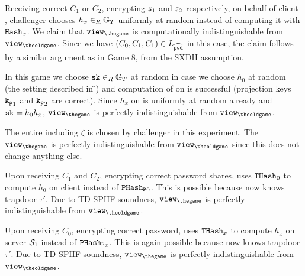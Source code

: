 \Gh Receiving correct $C_1$ or $C_2$, \ie encrypting $\mathfrak{s}_1$ and $\mathfrak{s}_2$ respectively, on behalf of client \Client, challenger \Challenger chooses $h_x\in_R\mathbb{G}_T$ uniformly at random instead of computing it with $\mathtt{Hash}_x$.
We claim that $\view_{\thegame}$ is computationally indistinguishable from $\view_{\theoldgame}$.
Since we have $(C_0,C_1,C_1)\in L_{\widehat{\mathtt{pwd}}}$ in this case, the claim follows by a similar argument as in Game 8, \ie from the SXDH assumption.

\Gh In this game we choose $\mathtt{sk}\in_R\mathbb{G}_T$ at random in case we choose $h_0$ at random (the setting described in \G{\theoldgame}) and computation of \sk on \Client is successful (projection keys $\mathtt{k_p}_1$ and $\mathtt{k_p}_2$ are correct).
Since $h_x$ on \Client is uniformly at random already and $\mathtt{sk}=h_0h_x$, $\view_{\thegame}$ is perfectly indistinguishable from $\view_{\theoldgame}$.


\Gh The entire \crs including $\zeta$ is chosen by challenger \Challenger in this experiment.
The $\view_{\thegame}$ is perfectly indistinguishable from $\view_{\theoldgame}$ since this does not change anything else.

\Gh Upon receiving $C_1$ and $C_2$, encrypting correct password shares, \Challenger uses $\mathtt{THash}_0$ to compute $h_0$ on client \Client instead of $\mathtt{PHash_P}_0$.
This is possible because \Challenger now knows trapdoor $\tau'$.
Due to \ac{TD-SPHF} soundness, $\view_{\thegame}$ is perfectly indistinguishable from $\view_{\theoldgame}$.

\Gh Upon receiving $C_0$, encrypting correct password, \Challenger uses $\mathtt{THash}_x$ to compute $h_x$ on server $\mathcal{S}_1$ instead of $\mathtt{PHash_P}_x$.
This is again possible because \Challenger now knows trapdoor $\tau'$.
Due to \ac{TD-SPHF} soundness, $\view_{\thegame}$ is perfectly indistinguishable from $\view_{\theoldgame}$.

